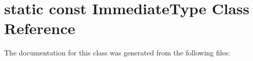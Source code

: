 \hypertarget{classstatic_01const_01ImmediateType}{}\section{static const Immediate\+Type Class Reference}
\label{classstatic_01const_01ImmediateType}


The documentation for this class was generated from the following files\+: